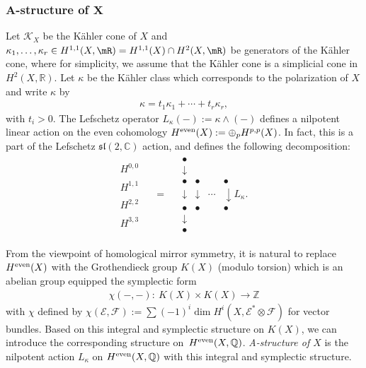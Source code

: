 \documentclass[10pt,a4paper]{amsart}
\numberwithin{equation}{section}
\begin{document}
\subsubsection[A-structure of $X$]{A-structure of $\boldsymbol{X}$} Let $\mathcal{K}_{X}$ be the K\"ahler cone of $X$ and $\kappa_{1},\dots,\kappa_{r}\in H^{1,1}(X,\mR)=H^{1,1}(X)\cap H^{2}(X,\mR)$ be ge\-nerators of the K\"ahler cone, where for simplicity, we assume that the K\"ahler cone is a simplicial cone in $H^{2}(X,\mathbb{R})$. Let $\kappa$ be the K\"ahler class which corresponds to the polarization of $X$ and write $\kappa$ by
\begin{gather*}
\kappa=t_{1}\kappa_{1}+\cdots+t_{r}\kappa_{r},
\end{gather*}
with $t_{i}>0$. The Lefschetz operator $L_{\kappa}(-):=\kappa\wedge(-)$ defines a nilpotent linear action on the even cohomology $H^{\rm even}(X):=\oplus_{p}H^{p,p}(X)$. In fact, this is a part of the Lefschetz $\mathfrak{sl}(2,\mathbb{C})$ action, and defines the following decomposition:
\begin{gather*}
\begin{matrix}H^{0,0}\\
\\
H^{1,1}\\
\\
H^{2,2}\\
\\
H^{3,3}
\end{matrix}\;\;\;\;=\;\;\;\;\begin{matrix}\bullet\\
\downarrow\\
\bullet & \bullet & & \bullet~~~~~\\
\downarrow & \downarrow & \cdots & \downarrow L_{\kappa}.\\
\bullet & \bullet & & \bullet~~~~~ \\
\downarrow\\
\bullet
\end{matrix}
\end{gather*}

From the viewpoint of homological mirror symmetry, it is natural to replace $H^{\rm even}(X)$ with the Grothendieck group $K(X)$ (modulo torsion) which is an abelian group equipped the symplectic form
\begin{gather*}
\chi(-,-)\colon \ K(X)\times K(X)\to\mathbb{Z}
\end{gather*}
with $\chi$ defined by $\chi(\mathcal{E},\mathcal{F}):=\sum(-1)^{i}\dim H^{i}(X,\mathcal{E}^{*}\otimes\mathcal{F})$ for vector bundles. Based on this integral and symplectic structure on $K(X)$, we can introduce the corresponding structure on~$H^{\rm even}(X,\mathbb{Q})$. \textit{A-structure of $X$} is the nilpotent action $L_{\kappa}$ on $H^{\rm even}(X,\mathbb{Q})$ with this integral and symplectic structure.
\end{document}
